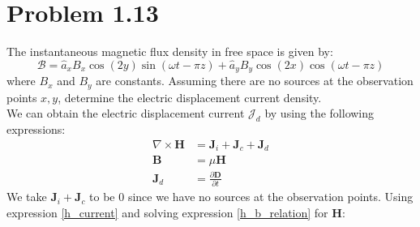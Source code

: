 \documentclass[12pt]{article}
\begin{document}
\section*{Problem 1.13}
The instantaneous magnetic flux density in free space is given by:
\[
{\bm{\mathcal{B}}} = \hat{a}_x B_x \cos(2y) \sin(\omega t - \pi z) + \hat{a}_y B_y \cos(2x) \cos(\omega t - \pi z)
\]
where \( B_x \) and \( B_y \) are constants. Assuming there are no sources at the observation points \( x, y \), determine the electric displacement current density.\\
We can obtain the electric displacement current $\mathcal{J}_d$ by using the following expressions:
\begin{align}
  \nabla \times \bm{H} &= \bm{J}_i +  \bm{J}_c +  \bm{J}_d\label{h_current}\\
  \bm{B} &= \mu \bm{H}\label{h_b_relation}\\
  \bm{J}_d &= \frac{\partial\bm{D}}{\partial t}\label{displacement_curr}
\end{align}
\newpage
\noindent
We take $\bm{J}_i +  \bm{J}_c$ to be 0 since we have no sources at the observation points. Using expression \ref{h_current} and solving expression \ref{h_b_relation} for $\bm{H}$:
\end{document}
